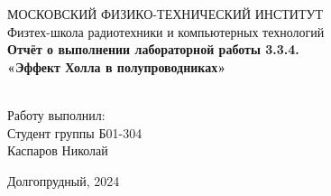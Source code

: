 \begin{center}
МОСКОВСКИЙ ФИЗИКО-ТЕХНИЧЕСКИЙ ИНСТИТУТ \\

\hfill \break
Физтех-школа радиотехники и компьютерных технологий\\
\vspace{5cm}
\large{\textbf{Отчёт о выполнении лабораторной работы 3.3.4. \\ «Эффект Холла в полупроводниках»}}\\
\hfill \break
\\
\end{center}

\vspace{5cm}
 
\begin{flushright}
Работу выполнил:\\
Студент группы Б01-304\\
Каспаров Николай\\
\end{flushright}
 
\vfill


\begin{center} Долгопрудный, 2024 \end{center}

\thispagestyle{empty}
\newpage
